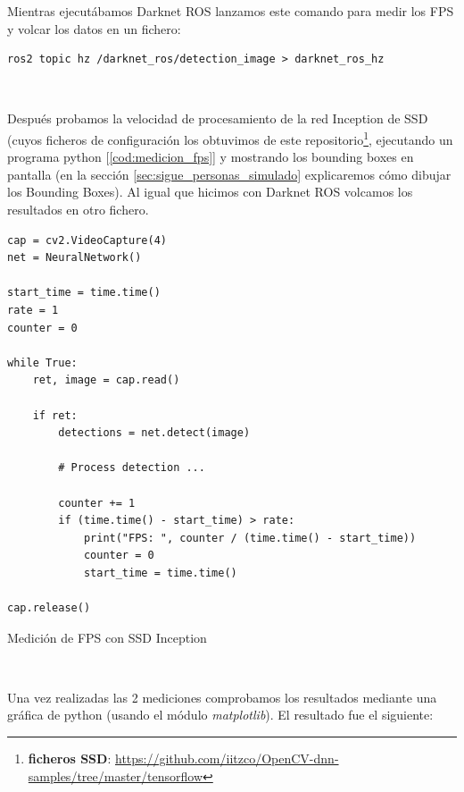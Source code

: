 Mientras ejecutábamos Darknet ROS lanzamos este comando para medir los FPS y volcar los datos en un fichero:\\

\begin{lstlisting}
ros2 topic hz /darknet_ros/detection_image > darknet_ros_hz
\end{lstlisting}\

Después probamos la velocidad de procesamiento de la red Inception de SSD (cuyos ficheros de configuración los obtuvimos de este repositorio\footnote{\textbf{ficheros SSD}: \url{https://github.com/iitzco/OpenCV-dnn-samples/tree/master/tensorflow}}, ejecutando un programa python [\ref{cod:medicion_fps}] y mostrando los bounding boxes en pantalla (en la sección \ref{sec:sigue_personas_simulado} explicaremos cómo dibujar los Bounding Boxes). Al igual que hicimos con Darknet ROS volcamos los resultados en otro fichero.\\

\begin{code}[H]
\begin{lstlisting}
cap = cv2.VideoCapture(4)
net = NeuralNetwork()

start_time = time.time()
rate = 1
counter = 0

while True:
	ret, image = cap.read()
	
	if ret:
		detections = net.detect(image)
		
		# Process detection ...

		counter += 1
		if (time.time() - start_time) > rate:
			print("FPS: ", counter / (time.time() - start_time))
			counter = 0
			start_time = time.time()

cap.release()
\end{lstlisting}
\caption{Medición de FPS con SSD Inception}
\label{cod:medicion_fps}
\end{code}\

Una vez realizadas las 2 mediciones comprobamos los resultados mediante una gráfica de python (usando el módulo \textit{matplotlib}). El resultado fue el siguiente:\\

